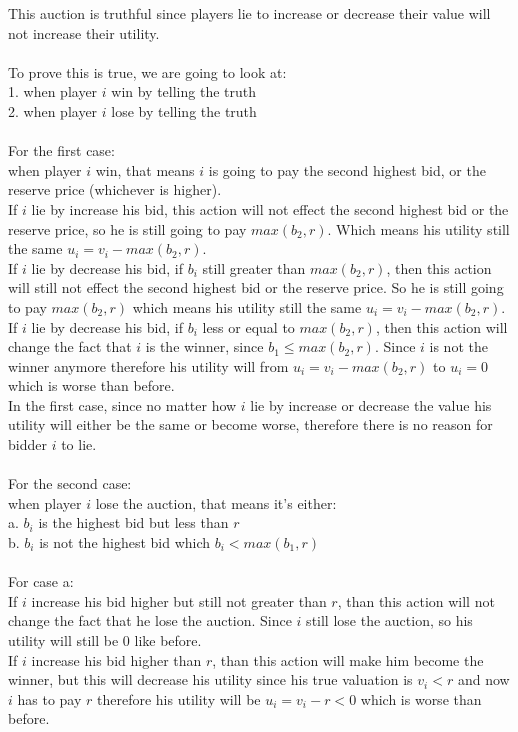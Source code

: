 \documentclass{article}
\begin{document}
This auction is truthful since players lie to increase or decrease their value will not increase their utility.\\\\
To prove this is true, we are going to look at:\\
1. when player $i$ win by telling the truth\\
2. when player $i$ lose by telling the truth\\\\
For the first case:\\
when player $i$ win, that means $i$ is going to pay the second highest bid, or the reserve price (whichever is higher).\\
If $i$ lie by increase his bid, this action will not effect the second highest bid or the reserve price, so he is still going to pay $max(b_2,r)$. Which means his utility still the same $u_i = v_i - max(b_2,r)$.\\
If $i$ lie by decrease his bid, if $b_i$ still greater than $max(b_2,r)$, then this action will still not effect the second highest bid or the reserve price. So he is still going to pay $max(b_2,r)$ which means his utility still the same $u_i = v_i - max(b_2,r)$.\\
If $i$ lie by decrease his bid, if $b_i$ less or equal to $max(b_2,r)$, then this action will change the fact that $i$ is the winner, since $b_1 \leq max(b_2,r)$. Since $i$ is not the winner anymore therefore his utility will from  $u_i = v_i - max(b_2,r)$ to $u_i = 0$ which is worse than before.\\
In the first case, since no matter how $i$ lie by increase or decrease the value his utility will either be the same or become worse, therefore there is no reason for bidder $i$ to lie.\\\\
For the second case:\\
when player $i$ lose the auction, that means it's either: \\
a. $b_i$ is the highest bid but less than $r$\\
b. $b_i$ is not the highest bid which $b_i < max(b_1,r)$\\\\
For case a: \\
If $i$ increase his bid higher but still not greater than $r$, than this action will not change the fact that he lose the auction. Since $i$ still lose the auction, so his utility will still be $0$ like before.\\ 
If $i$ increase his bid higher than $r$, than this action will make him become the winner, but this will decrease his utility since his true valuation is $v_i < r$ and now $i$ has to pay $r$ therefore his utility will be $u_i = v_i - r < 0$ which is worse than before.\\
\end{document}

